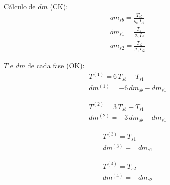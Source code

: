 \documentclass[10pt,a4paper]{article}
\begin{document}
	Cálculo de $ dm $ (OK):
	\begin{equation}
		\begin{gathered}
			dm_{sb} = \frac{T_{sb}}{g_0 \, I_{sb}} \\
			dm_{s1} = \frac{T_{s1}}{g_0 \, I_{s1}} \\
			dm_{s2} = \frac{T_{s2}}{g_0 \, I_{s2}}
		\end{gathered}
	\end{equation}
	
	$ T $ e $ dm $ de cada fase (OK):
	\begin{equation}
		\begin{gathered}
			T^{(1)} = 6 \, T_{sb} + T_{s1} \\
			dm^{(1)} = -6 \, dm_{sb} - dm_{s1}
		\end{gathered}
	\end{equation}
	
	\begin{equation}
		\begin{gathered}
			T^{(2)} = 3 \, T_{sb} + T_{s1} \\
			dm^{(2)} = -3 \, dm_{sb} - dm_{s1}
		\end{gathered}
	\end{equation}
	
	\begin{equation}
		\begin{gathered}
			T^{(3)} = T_{s1} \\
			dm^{(3)} = - dm_{s1}
		\end{gathered}
	\end{equation}
	
	\begin{equation}
		\begin{gathered}
			T^{(4)} = T_{s2} \\
			dm^{(4)} = - dm_{s2}
		\end{gathered}
	\end{equation}	
	
\end{document}
